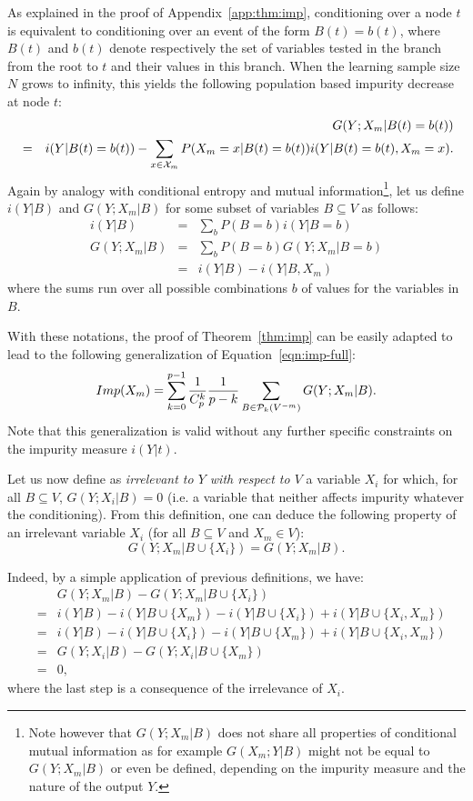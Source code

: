\documentclass{article}
\begin{document}
As explained in the proof of Appendix~\ref{app:thm:imp}, conditioning
over a node $t$ is equivalent to conditioning over an event of the
form $B(t)=b(t)$, where $B(t)$ and $b(t)$ denote respectively the set
of variables tested in the branch from the root to $t$ and their
values in this branch. When the learning sample size $N$ grows to
infinity, this yields the following population based impurity decrease
at node $t$:
\begin{eqnarray*}
&&G(Y;X_m|B(t)=b(t))\nonumber \\
& = & i(Y|B(t)=b(t))-\sum_{x\in{\cal X}_m}
P(X_m=x|B(t)=b(t)) i(Y|B(t)=b(t),X_m=x).\nonumber \\\label{eqn:imppop}
\end{eqnarray*}
Again by analogy with conditional entropy and mutual
information\footnote{Note however that $G(Y;X_m|B)$ does not share all
  properties of conditional mutual information as for example $G(X_m;
  Y|B)$ might not be equal to $G(Y; X_m|B)$ or even be defined,
  depending on the impurity measure and the nature of the output
  $Y$.}, let us define $i(Y|B)$ and $G(Y;X_m|B)$ for some subset of
variables $B\subseteq V$ as follows:
\begin{eqnarray*}
i(Y|B)&=&\sum_{b} P(B=b) i(Y|B=b)\\
G(Y;X_m|B)&=& \sum_{b} P(B=b) G(Y;X_m|B=b)\\
&=&i(Y|B)-i(Y|B,X_m)
\end{eqnarray*}
where the sums run over all possible combinations $b$ of values for
the variables in $B$.

With these notations, the proof of Theorem~\ref{thm:imp} can be easily adapted to lead
to the following generalization of Equation~\ref{eqn:imp-full}:
\begin{equation*}
Imp(X_m)=\sum_{k=0}^{p-1} \frac{1}{C_p^k} \frac{1}{p-k} \sum_{B \in
  {\cal P}_k(V^{-m})} G(Y;X_m|B).
\end{equation*}
Note that this generalization is valid without any further specific constraints
on the impurity measure $i(Y|t)$.

Let us now define as {\it irrelevant to $Y$ with respect to $V$} a
variable $X_i$ for which, for all $B\subseteq V$,
$G(Y;X_i|B)=0$ (i.e. a variable that neither affects impurity
whatever the conditioning). From this definition, one can deduce the
following property of an irrelevant variable $X_i$ (for all
$B\subseteq V$ and $X_m\in V$):
$$G(Y;X_m|B\cup\{X_i\})=G(Y;X_m|B).$$

Indeed, by a simple application of previous definitions, we have:
\begin{eqnarray*}
&&G(Y;X_m|B)-G(Y;X_m|B\cup\{X_i\})\nonumber\\
& = & i(Y|B)-i(Y|B\cup\{X_m\})-i(Y|B\cup\{X_i\})+i(Y|B\cup\{X_i,X_m\})\\
& = & i(Y|B)-i(Y|B\cup\{X_i\})-i(Y|B\cup\{X_m\})+i(Y|B\cup\{X_i,X_m\})\\
& = & G(Y;X_i|B)-G(Y;X_i|B\cup\{X_m\})\\
& = & 0,
\end{eqnarray*}
where the last step is a consequence of the irrelevance of $X_i$.
\end{document}
